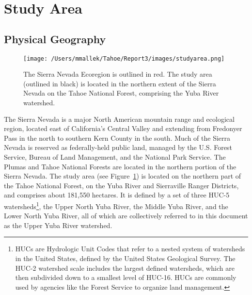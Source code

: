 \section{Study Area}

\subsection{Physical Geography}

\begin{figure}[!htbp]
\texttt{[image: /Users/mmallek/Tahoe/Report3/images/studyarea.png]}
\caption{The Sierra Nevada Ecoregion is outlined in red. The study area (outlined in black) is located in the northern extent of the Sierra Nevada on the Tahoe National Forest, comprising the Yuba River watershed.}
\label{projectarea}
\end{figure}

The Sierra Nevada is a major North American mountain range and ecological region, located east of California's Central Valley and extending from Fredonyer Pass in the north to southern Kern County in the south. Much of the Sierra Nevada is reserved as federally-held public land, managed by the U.S. Forest Service, Bureau of Land Management, and the National Park Service. The Plumas and Tahoe National Forests are located in the northern portion of the Sierra Nevada. The study area (see Figure~\ref{projectarea}) is located on the northern part of the Tahoe National Forest, on the Yuba River and Sierraville Ranger Districts, and comprises about 181,550 hectares. It is defined by a set of three HUC-5 watersheds\footnote{HUCs are Hydrologic Unit Codes that refer to a nested system of watersheds in the United States, defined by the United States Geological Survey. The HUC-2 watershed scale includes the largest defined watersheds, which are then subdivided down to a smallest level of HUC-16. HUCs are commonly used by agencies like the Forest Service to organize land management.}, the Upper North Yuba River, the Middle Yuba River, and the Lower North Yuba River, all of which are collectively referred to in this document as the Upper Yuba River watershed. 

